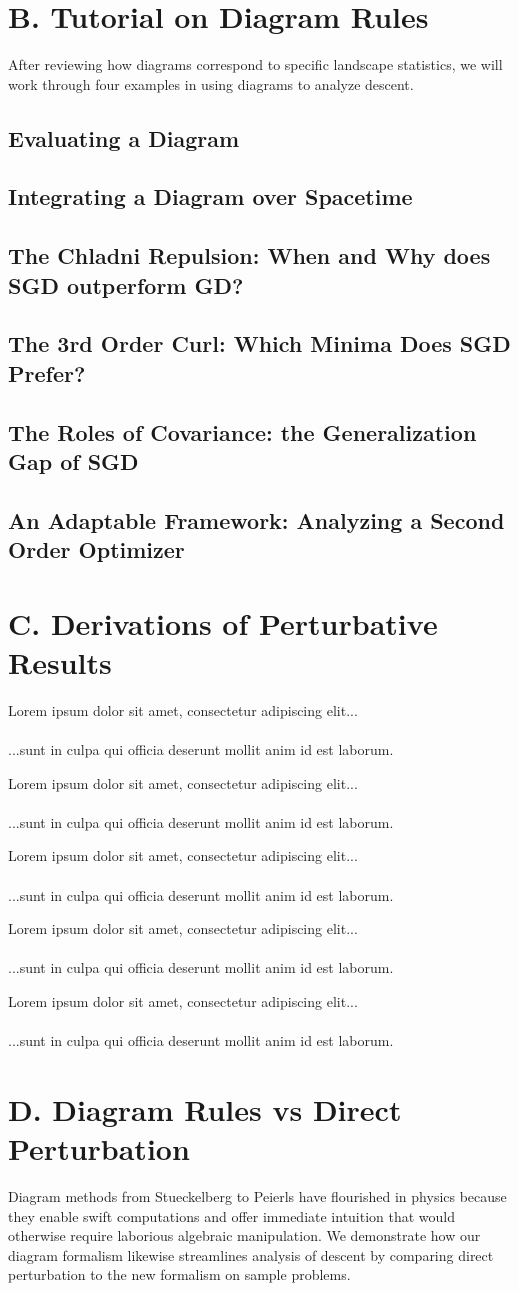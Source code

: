 \documentclass{article}
\newcommand{\lorem}[1]{
    Lorem ipsum dolor sit amet, consectetur adipiscing elit...\\
    \nopagebreak\vspace{#1cm} \ \\
    ...sunt in culpa qui officia deserunt mollit anim id est laborum.
}
\begin{document}
\section*{B. Tutorial on Diagram Rules}
    After reviewing how diagrams correspond to specific landscape statistics,
    we will work through four examples in using diagrams to analyze descent.

    \subsection*{Evaluating a Diagram}
        
    \subsection*{Integrating a Diagram over Spacetime}
        
    \subsection*{The Chladni Repulsion: When and Why does SGD outperform GD?}
        
    \subsection*{The 3rd Order Curl: Which Minima Does SGD Prefer?}
        
    \subsection*{The Roles of Covariance: the Generalization Gap of SGD}
        
    \subsection*{An Adaptable Framework: Analyzing a Second Order Optimizer}

\section*{C. Derivations of Perturbative Results}

    \lorem{3}
    \lorem{3}
    \lorem{3}
    \lorem{3}
    \lorem{3}

\section*{D. Diagram Rules vs Direct Perturbation}
    Diagram methods from Stueckelberg to Peierls have flourished in physics
    because they enable swift computations and offer immediate intuition that
    would otherwise require laborious algebraic manipulation.  We demonstrate
    how our diagram formalism likewise streamlines analysis of descent by
    comparing direct perturbation to the new formalism on sample problems.
\end{document}
